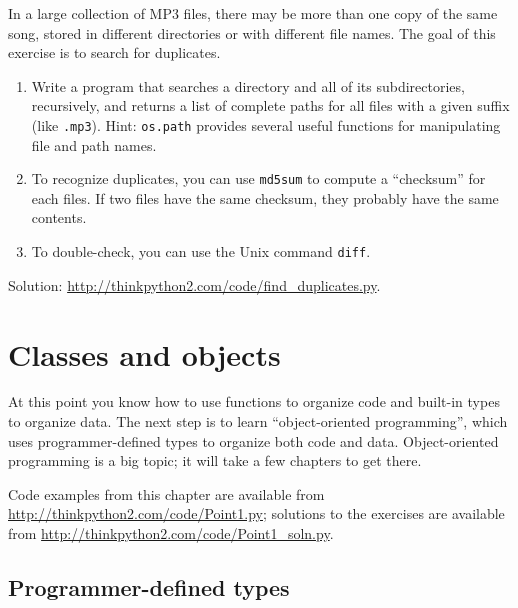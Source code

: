\documentclass[10pt]{book}
\begin{document}
\begin{exercise}
\label{checksum}

In a large collection of MP3 files, there may be more than one
copy of the same song, stored in different directories or with
different file names.  The goal of this exercise is to search for
duplicates.

\begin{enumerate}

\item Write a program that searches a directory and all of its
subdirectories, recursively, and returns a list of complete paths
for all files with a given suffix (like {\tt .mp3}).
Hint: {\tt os.path} provides several useful functions for
manipulating file and path names.

\item To recognize duplicates, you can use {\tt md5sum}
to compute a ``checksum'' for each files.  If two files have
the same checksum, they probably have the same contents.

\item To double-check, you can use the Unix command {\tt diff}.

\end{enumerate}

Solution: \url{http://thinkpython2.com/code/find_duplicates.py}.

\end{exercise}



\chapter{Classes and objects}
\label{clobjects}

At this point you know how to use
functions to organize code and 
built-in types to organize data.  The next step is to learn
``object-oriented programming'', which uses programmer-defined types
to organize both code and data.  Object-oriented programming is
a big topic; it will take a few chapters to get there.

Code examples from this chapter are available from
\url{http://thinkpython2.com/code/Point1.py}; solutions
to the exercises are available from
\url{http://thinkpython2.com/code/Point1_soln.py}.


\section{Programmer-defined types}
\label{point}
\end{document}
